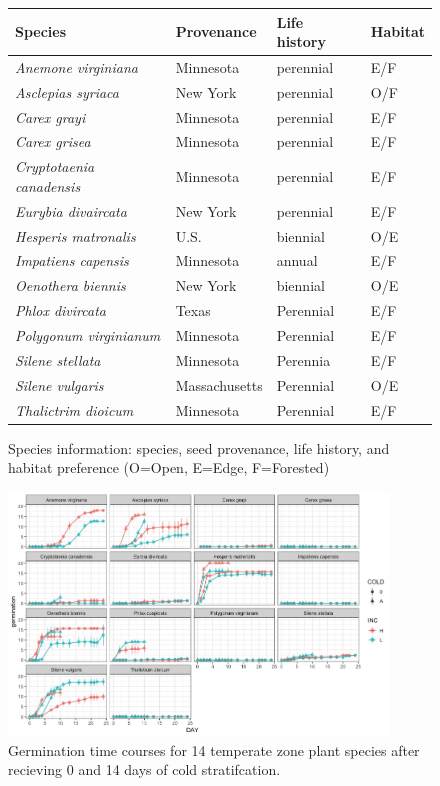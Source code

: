 \documentclass{article}\usepackage[]{graphicx}\usepackage[]{color}
\begin{document}
\begin{figure}[here]
\begin{center}
\begin{tabular}{|l|l|l|l|}
\hline
\textbf{Species} & \textbf{Provenance} & \textbf{Life history} & \textbf{Habitat}\\
\hline
\textit{Anemone virginiana} & Minnesota & perennial & E/F\\
\hline
\textit{Asclepias syriaca} & New York & perennial & O/F \\
\hline
\textit{Carex grayi} & Minnesota & perennial & E/F\\
\hline
\textit{Carex grisea}& Minnesota & perennial & E/F\\
\hline
\textit{Cryptotaenia canadensis} & Minnesota & perennial & E/F\\
\hline
\textit{Eurybia divaircata} & New York & perennial & E/F\\
\hline
\textit{Hesperis matronalis} & U.S. & biennial & O/E\\
\hline
\textit{Impatiens capensis} & Minnesota & annual & E/F \\
\hline
\textit{Oenothera biennis} & New York & biennial & O/E \\
\hline
\textit{Phlox divircata} & Texas & Perennial & E/F\\
\hline
\textit{Polygonum virginianum} & Minnesota & Perennial & E/F\\
\hline
\textit{Silene stellata} & Minnesota & Perennia & E/F\\
\hline
\textit{Silene vulgaris} & Massachusetts & Perennial & O/E\\
\hline
\textit{Thalictrim dioicum} & Minnesota & Perennial & E/F\\
\hline
\end{tabular}
\caption{Species information: species, seed provenance, life history, and habitat preference (O=Open, E=Edge, F=Forested)}
\label{fig:Figure 5}
\end{center}
\end{figure}


\begin{figure}[here]
\begin{center}
\includegraphics[width=0.9\textwidth]{..//figures/time_course2_output.jpeg}
\caption{Germination time courses for 14 temperate zone plant species after recieving 0 and 14 days of cold stratifcation.}
\label{fig:Figure 6}
\end{center}
\end{figure}
\end{document}
